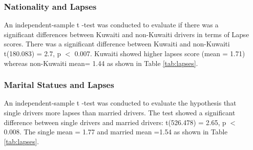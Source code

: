\documentclass[preprint,12pt,a4paper,authoryear]{elsarticle}
\begin{document}
\subsubsection{Nationality and Lapses}
An independent-sample t -test was conducted to evaluate if there was a significant differences between Kuwaiti and non-Kuwaiti drivers in terms of Lapse scores. There was a significant difference between Kuwaiti and non-Kuwaiti t(180.083) = 2.7, p $<$ 0.007. Kuwaiti showed higher lapses score (mean = 1.71) whereas non-Kuwaiti mean= 1.44 as shown in Table \ref{tab:lapses}.

\subsubsection{Marital Statues and Lapses}
An independent-sample t -test was conducted to evaluate the hypothesis that single drivers more lapses than married drivers. The test showed a significant difference between single drivers and married drivers: t(526.478) = 2.65, p $<$ 0.008. The single mean = 1.77 and married mean =1.54 as shown in Table \ref{tab:lapses}.

\begin{table}[H]
\centering
\caption{Tests vs lapses.}
\label{tab:lapses}
\end{table}
\end{document}
